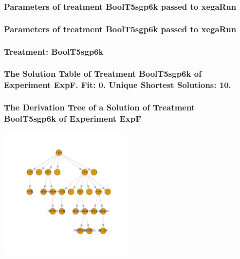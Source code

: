 \documentclass[18pt,c]{beamer}
\begin{document}

 \begin{frame}
 \fontsize{8pt}{9pt}\selectfont
 \frametitle{  Parameters of treatment BoolT5sgp6k passed to xegaRun
 }

 \label{ExpFtParmTable030.tex}  
 \end{frame}


 \begin{frame}
 \fontsize{8pt}{9pt}\selectfont
 \frametitle{  Parameters of treatment BoolT5sgp6k passed to xegaRun
 }

 \label{ExpFtParmTable031.tex}  
 \end{frame}

 \begin{frame}
 \fontsize{8pt}{9pt}\selectfont
 \frametitle{ Treatment: BoolT5sgp6k }

 \label{ExpFStatsTable013.tex}  
 \end{frame}

 \begin{frame}
 \fontsize{8pt}{9pt}\selectfont
 \frametitle{ The Solution Table of Treatment BoolT5sgp6k of Experiment ExpF. Fit: 0. Unique Shortest Solutions: 10. }

 \label{ExpFSolutionTable007.tex}  
 \end{frame}

 \begin{frame}
 \frametitle{ The Derivation Tree of a Solution of Treatment BoolT5sgp6k of Experiment ExpF }
 \begin{center}
\includegraphics[width=0.5\textwidth, angle=0]
{ExpFDerivationTreeFigure007.pdf}
 \end{center}
 \label{report/ExpFDerivationTreeFigure007.pdf}  
 \end{frame}
\end{document}
